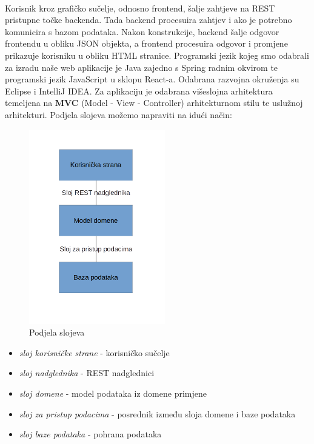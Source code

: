 	\\
	Korisnik kroz grafičko sučelje, odnosno frontend, šalje zahtjeve na REST pristupne točke backenda. Tada backend procesuira zahtjev i ako je potrebno komunicira s bazom podataka. Nakon konstrukcije, backend šalje odgovor frontendu u obliku JSON objekta, a frontend procesuira odgovor i promjene prikazuje korisniku u obliku HTML stranice.
\eject
	Programski jezik kojeg smo odabrali za izradu naše web aplikacije je Java zajedno s Spring radnim okvirom te programski jezik JavaScript u sklopu React-a. Odabrana razvojna okruženja su Eclipse i IntelliJ IDEA. Za aplikaciju je odabrana višeslojna arhitektura temeljena na \textbf{MVC} (Model - View - Controller) arhitekturnom stilu te uslužnoj arhitekturi. Podjela slojeva možemo napraviti na idući način:
	\begin{figure}[H]
			\centering
			\includegraphics[scale=0.9]{slike/arhitektura2.png}
			\caption{Podjela slojeva}
			\label{fig:slojevi}
		\end{figure}
	\begin{itemize}
		\item 	\textit{sloj korisničke strane} - korisničko sučelje
		\item 	\textit{sloj nadglednika} - REST nadglednici
		\item 	\textit{sloj domene}	- model podataka iz domene primjene
		\item 	\textit{sloj za pristup podacima} - posrednik između sloja domene i baze podataka
		\item 	\textit{sloj baze podataka} - pohrana podataka	
		\end{itemize}

